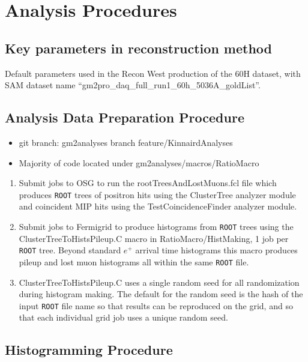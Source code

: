\graphicspath{ {Figures/CBO/Frequency/} {Figures/VW/} }

\chapter{Analysis Procedures}
\label{Ch:Procedures}


\section{Key parameters in reconstruction method}

	Default parameters used in the Recon West production of the 60H dataset, with SAM dataset name ``gm2pro\_daq\_full\_run1\_60h\_5036A\_goldList''.

\section{Analysis Data Preparation Procedure}

	\begin{itemize}
		\item{git branch: gm2analyses branch feature/KinnairdAnalyses}
		\item{Majority of code located under gm2analyses/macros/RatioMacro}
	\end{itemize}

	\begin{enumerate}
		\item{Submit jobs to OSG to run the rootTreesAndLostMuons.fcl file which produces \texttt{ROOT} trees of positron hits using the ClusterTree analyzer module and coincident MIP hits using the TestCoincidenceFinder analyzer module.}
		\item{Submit jobs to Fermigrid to produce histograms from \texttt{ROOT} trees using the ClusterTreeToHistsPileup.C macro in RatioMacro/HistMaking, 1 job per \texttt{ROOT} tree. Beyond standard $e^{+}$ arrival time histograms this macro produces pileup and lost muon histograms all within the same \texttt{ROOT} file.}
		\item{ClusterTreeToHistsPileup.C uses a single random seed for all randomization during histogram making. The default for the random seed is the hash of the input \texttt{ROOT} file name so that results can be reproduced on the grid, and so that each individual grid job uses a unique random seed.}
	\end{enumerate}


\section{Histogramming Procedure}

